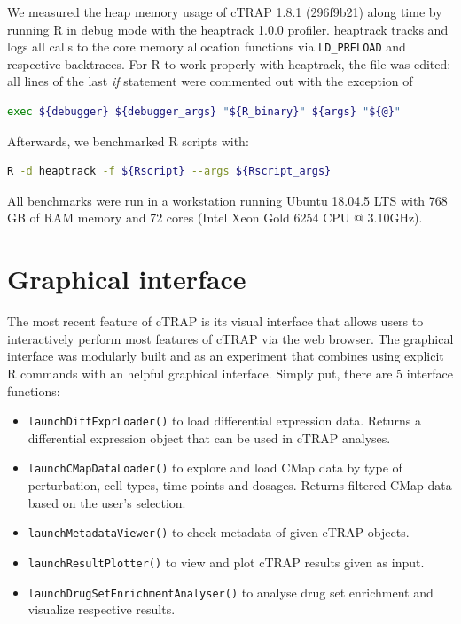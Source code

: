 We measured the heap memory usage of cTRAP 1.8.1 (296f9b21) along time by running R in debug mode with the heaptrack 1.0.0 profiler. heaptrack tracks and logs all calls to the core memory allocation functions via \verb|LD_PRELOAD| and respective backtraces. For R to work properly with heaptrack, the file  was edited: all lines of the last \emph{if} statement were commented out with the exception of

\begin{lstlisting}[language=bash,numbers=none]
exec ${debugger} ${debugger_args} "${R_binary}" ${args} "${@}"
\end{lstlisting}

Afterwards, we benchmarked R scripts with:

\begin{lstlisting}[language=bash,numbers=none]
R -d heaptrack -f ${Rscript} --args ${Rscript_args}
\end{lstlisting}

All benchmarks were run in a workstation running Ubuntu 18.04.5 LTS with 768 GB of RAM memory and 72 cores (Intel Xeon Gold 6254 CPU @ 3.10GHz).

\section{Graphical interface}

The most recent feature of cTRAP is its visual interface that allows users to interactively perform most features of cTRAP via the web browser. The graphical interface was modularly built and as an experiment that combines using explicit R commands with an helpful graphical interface. Simply put, there are 5 interface functions:

\begin{itemize}
	\item \texttt{launchDiffExprLoader()} to load differential expression data. Returns a differential expression object that can be used in cTRAP analyses.
	\item \texttt{launchCMapDataLoader()} to explore and load CMap data by type of perturbation, cell types, time points and dosages. Returns filtered CMap data based on the user's selection.
	\item \texttt{launchMetadataViewer()} to check metadata of given cTRAP objects.
	\item \texttt{launchResultPlotter()} to view and plot cTRAP results given as input.
	\item \texttt{launchDrugSetEnrichmentAnalyser()} to analyse drug set enrichment and visualize respective results.
\end{itemize}

